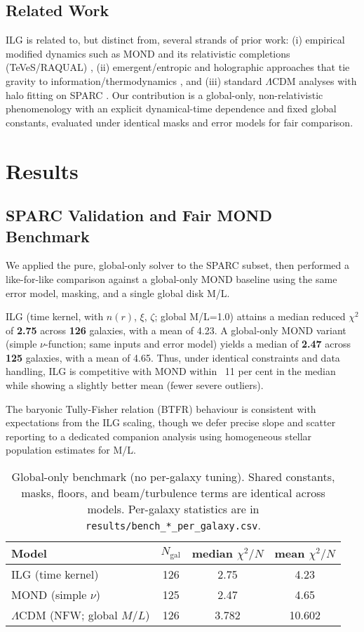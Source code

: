 \documentclass[usenatbib]{mnras}
\begin{document}
\subsection{Related Work}
\noindent ILG is related to, but distinct from, several strands of prior work: (i) empirical modified dynamics such as MOND and its relativistic completions (TeVeS/RAQUAL) \citep{milgrom1983,bekenstein2004,famaey2012}, (ii) emergent/entropic and holographic approaches that tie gravity to information/thermodynamics \citep{verlinde2011,verlinde2017}, and (iii) standard $\Lambda$CDM analyses with halo fitting on SPARC \citep{li2018}. Our contribution is a global-only, non-relativistic phenomenology with an explicit dynamical-time dependence and fixed global constants, evaluated under identical masks and error models for fair comparison.

\section{Results}

\subsection{SPARC Validation and Fair MOND Benchmark}

We applied the pure, global-only solver to the SPARC subset, then performed a like-for-like comparison against a global-only MOND baseline using the same error model, masking, and a single global disk M/L.

ILG (time kernel, with $n(r)$, $\xi$, $\zeta$; global M/L=1.0) attains a median reduced $\chi^2$ of \textbf{2.75} across \textbf{126} galaxies, with a mean of 4.23. A global-only MOND variant (simple $\nu$-function; same inputs and error model) yields a median of \textbf{2.47} across \textbf{125} galaxies, with a mean of 4.65. Thus, under identical constraints and data handling, ILG is competitive with MOND within ~11 per cent in the median while showing a slightly better mean (fewer severe outliers).

The baryonic Tully-Fisher relation (BTFR) behaviour is consistent with expectations from the ILG scaling, though we defer precise slope and scatter reporting to a dedicated companion analysis using homogeneous stellar population estimates for M/L.

\begin{table}
\centering
\caption{Global-only benchmark (no per-galaxy tuning). Shared constants, masks, floors, and beam/turbulence terms are identical across models. Per-galaxy statistics are in \texttt{results/bench\_*\_per\_galaxy.csv}.}
\label{tab:global_bench}
\begin{tabular}{l c c c}
\toprule
Model & $N_\mathrm{gal}$ & median $\chi^2/N$ & mean $\chi^2/N$ \\
\midrule
ILG (time kernel) & 126 & 2.75 & 4.23 \\
MOND (simple $\nu$) & 125 & 2.47 & 4.65 \\
$\Lambda$CDM (NFW; global $M/L$) & 126 & 3.782 & 10.602 \\
\bottomrule
\end{tabular}
\end{table}
\end{document}
